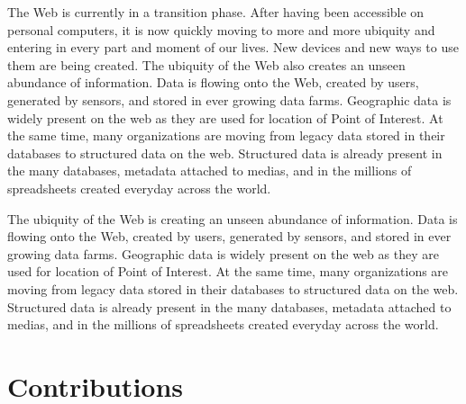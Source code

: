 The Web is currently in a transition phase. After having been accessible on personal computers, it is now 
quickly moving to more and more ubiquity and entering in every part and moment of our lives. New 
devices and new ways to use them are being created. The ubiquity of the Web also creates an unseen 
abundance of information. Data is flowing onto the Web, created by users, generated by sensors, and 
stored in ever growing data farms. Geographic data is widely present on the web as they are used for location 
of Point of Interest. At the same time, many organizations are moving from legacy data stored in their databases
to structured data on the web. Structured data is already present in the many databases, metadata attached to medias, and in the millions of spreadsheets created everyday across the world. 

The ubiquity of the Web is creating an unseen abundance of information. Data is flowing onto the Web, created by users, generated by sensors, and stored in ever growing data farms. Geographic data is widely present on the web as they are used for location of Point of Interest. At the same time, many organizations are moving from legacy data stored in their databases to structured data on the web. Structured data is already present in the many databases, metadata attached to medias, and in the millions of spreadsheets created everyday across the world.




\section{Contributions}
\label{sec:contributions}

